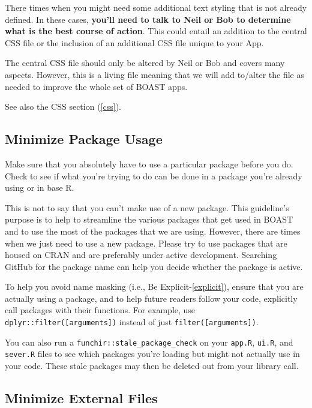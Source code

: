 \documentclass[]{book}
\begin{document}
There times when you might need some additional text styling that is not already defined. In these cases, \textbf{you'll need to talk to Neil or Bob to determine what is the best course of action}. This could entail an addition to the central CSS file or the inclusion of an additional CSS file unique to your App.

The central CSS file should only be altered by Neil or Bob and covers many aspects. However, this is a living file meaning that we will add to/alter the file as needed to improve the whole set of BOAST apps.

See also the CSS section (\ref{css}).

\hypertarget{minPackages}{%
\subsection{Minimize Package Usage}\label{minPackages}}

Make sure that you absolutely have to use a particular package before you do. Check to see if what you're trying to do can be done in a package you're already using or in base R.

This is not to say that you can't make use of a new package. This guideline's purpose is to help to streamline the various packages that get used in BOAST and to use the most of the packages that we are using. However, there are times when we just need to use a new package. Please try to use packages that are housed on CRAN and are preferably under active development. Searching GitHub for the package name can help you decide whether the package is active.

To help you avoid name masking (i.e., Be Explicit-\ref{explicit}), ensure that you are actually using a package, and to help future readers follow your code, explicitly call packages with their functions. For example, use \texttt{dplyr::filter({[}arguments{]})} instead of just \texttt{filter({[}arguments{]})}.

You can also run a \texttt{funchir::stale\_package\_check} on your \texttt{app.R}, \texttt{ui.R}, and \texttt{sever.R} files to see which packages you're loading but might not actually use in your code. These stale packages may then be deleted out from your library call.

\hypertarget{exFiles}{%
\subsection{Minimize External Files}\label{exFiles}}
\end{document}
